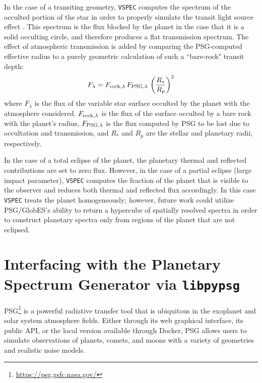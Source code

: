 \documentclass[twocolumn,linenumbers]{aastex631}
\newcommand{\vspec}[1]{\texttt{VSPEC}#1}
\begin{document}
In the case of a transiting geometry, \vspec{} computes the spectrum of the occulted portion of the star in order to properly simulate the transit light source effect \citep[TLS][]{rackham2018}. This spectrum is the flux blocked by the planet in the case that it is a solid occulting circle, and therefore produces a flat transmission spectrum. The effect of atmospheric transmission is added by comparing the PSG-computed effective radius to a purely geometric calculation of such a ``bare-rock" transit depth:
\begin{equation}
    F_{\lambda} = F_{{\rm rock}, \lambda}\, F_{{\rm PSG,} \lambda} \,\left (\frac{R_*}{R_p} \right )^2
\end{equation}
where $F_\lambda$ is the flux of the variable star surface occulted by the planet with the atmosphere considered. $F_{{\rm rock}, \lambda}$ is the flux of the surface occulted by a bare rock with the planet's radius, $F_{{\rm PSG,} \lambda}$ is the flux computed by PSG to be lost
due to occultation and transmission, and $R_*$ and $R_p$ are the stellar and planetary radii, respectively.

In the case of a total eclipse of the planet, the planetary thermal and reflected contributions are set to zero flux. However, in the case of a partial eclipse (large impact parameter), \vspec{} computes the fraction of the planet that is visible to the observer and reduces both thermal and reflected flux accordingly. In this case \vspec{} treats the planet homogeneously; however, future work could utilize PSG/GlobES's ability to return a hypercube of spatially resolved spectra in order to construct planetary spectra only from regions of the planet that are not eclipsed.

\section{Interfacing with the Planetary Spectrum Generator via \texttt{libpypsg}}
\label{sec:libpypsg}
PSG\footnote{\url{https://psg.gsfc.nasa.gov/}} \citep{villanueva2018} is a powerful radiative transfer tool that is ubiquitous in the exoplanet and solar system atmosphere fields. Either through its web graphical interface, its public API, or the local version available through Docker, PSG allows users to simulate observations of planets, comets, and moons with a variety of geometries and realistic noise models.
\end{document}
